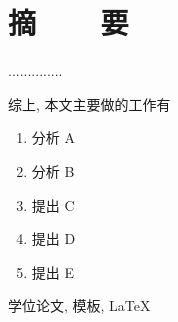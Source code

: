 \renewcommand{\baselinestretch}{1.5}
\fontsize{12pt}{13pt}\selectfont


\chapter{摘~~~~要}

..............

综上, 本文主要做的工作有
\vspace{-10pt}
\begin{enumerate}
	\item 分析 A
	\item 分析 B
	\item 提出 C
	\item 提出 D
	\item 提出 E
\end{enumerate}
\vspace{-10pt}

\vspace{1em}
 \quad 学位论文, 模板, \LaTeX

\clearpage
\endinput
